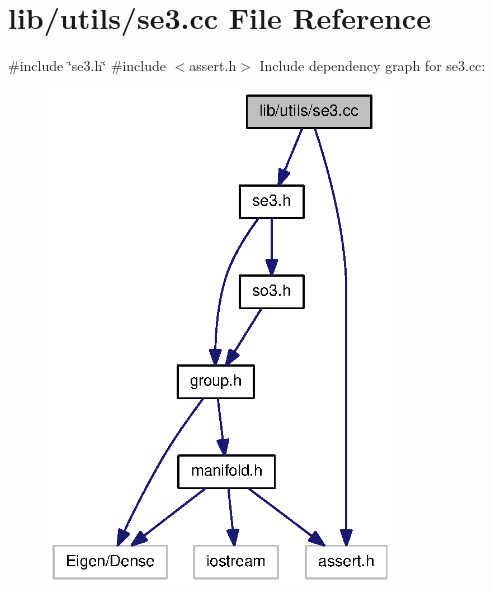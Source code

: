 \section{lib/utils/se3.cc \-File \-Reference}
\label{se3_8cc}
{\ttfamily \#include \char`\"{}se3.\-h\char`\"{}}\*
{\ttfamily \#include $<$assert.\-h$>$}\*
\-Include dependency graph for se3.\-cc\-:
\nopagebreak
\begin{figure}[H]
\begin{center}
\leavevmode
\includegraphics[width=258pt]{se3_8cc__incl}
\end{center}
\end{figure}
